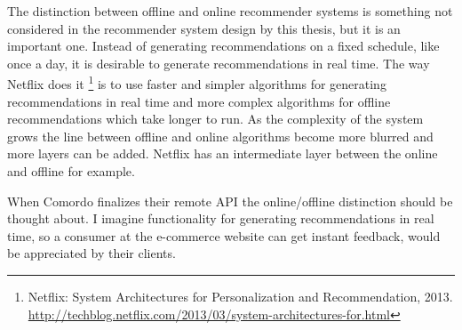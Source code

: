 The distinction between offline and online recommender systems is something not considered in the recommender system design by this thesis, but it is an important one. Instead of generating recommendations on a fixed schedule, like once a day, it is desirable to generate recommendations in real time. The way Netflix does it
\footnote{
Netflix: System Architectures for Personalization and Recommendation, 2013.
\url{http://techblog.netflix.com/2013/03/system-architectures-for.html}
}
is to use faster and simpler algorithms for generating recommendations in real time and more complex algorithms for offline recommendations which take longer to run.
As the complexity of the system grows the line between offline and online algorithms become more blurred and more layers can be added. Netflix has an intermediate layer between the online and offline for example.

When Comordo finalizes their remote API the online/offline distinction should be thought about. I imagine functionality for generating recommendations in real time, so a consumer at the e-commerce website can get instant feedback, would be appreciated by their clients.









